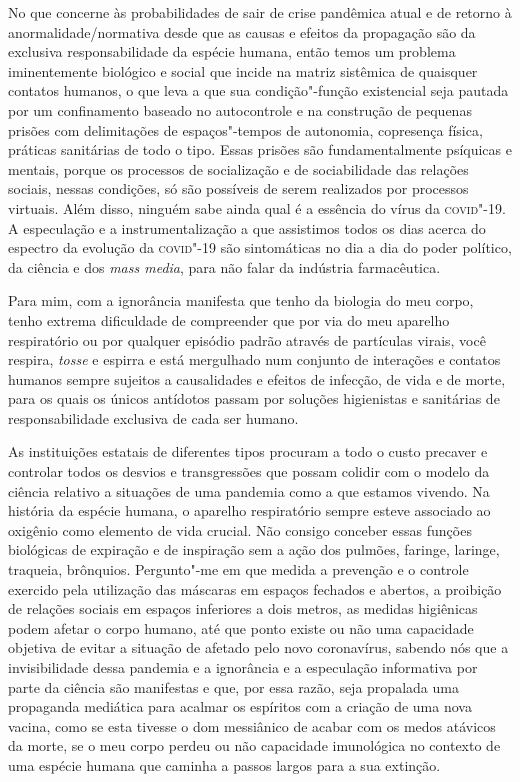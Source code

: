 No que concerne às probabilidades de sair de crise pandêmica atual e de
retorno à anormalidade/normativa desde que as causas e efeitos da
propagação são da exclusiva responsabilidade da espécie humana, então
temos um problema iminentemente biológico e social que incide na matriz
sistêmica de quaisquer contatos humanos, o que leva a que sua
condição"-função existencial seja pautada por um confinamento baseado no
autocontrole e na construção de pequenas prisões com delimitações de
espaços"-tempos de autonomia, copresença física, práticas sanitárias de
todo o tipo. Essas prisões são fundamentalmente psíquicas e mentais,
porque os processos de socialização e de sociabilidade das relações
sociais, nessas condições, só são possíveis de serem realizados por
processos virtuais. Além disso, ninguém sabe ainda qual é a essência do
vírus da \textsc{covid}"-19. A especulação e a instrumentalização a que assistimos
todos os dias acerca do espectro da evolução da \textsc{covid}"-19 são
sintomáticas no dia a dia do poder político, da ciência e dos \emph{mass
media}, para não falar da indústria farmacêutica.

Para mim, com a ignorância manifesta que tenho da biologia do meu corpo,
tenho extrema dificuldade de compreender que por via do meu aparelho
respiratório ou por qualquer episódio padrão através de partículas
virais, você respira, \emph{tosse} e espirra e está mergulhado num
conjunto de interações e contatos humanos sempre sujeitos a causalidades
e efeitos de infecção, de vida e de morte, para os quais os únicos
antídotos passam por soluções higienistas e sanitárias de
responsabilidade exclusiva de cada ser humano.

As instituições estatais de diferentes tipos procuram a todo o custo
precaver e controlar todos os desvios e transgressões que possam colidir
com o modelo da ciência relativo a situações de uma pandemia como a que
estamos vivendo. Na história da espécie humana, o aparelho respiratório
sempre esteve associado ao oxigênio como elemento de vida crucial. Não
consigo conceber essas funções biológicas de expiração e de inspiração
sem a ação dos pulmões, faringe, laringe, traqueia, brônquios.
Pergunto"-me em que medida a prevenção e o controle exercido pela
utilização das máscaras em espaços fechados e abertos, a proibição de
relações sociais em espaços inferiores a dois metros, as medidas
higiênicas podem afetar o corpo humano, até que ponto existe ou não uma
capacidade objetiva de evitar a situação de afetado pelo novo
coronavírus, sabendo nós que a invisibilidade dessa pandemia e a
ignorância e a especulação informativa por parte da ciência são
manifestas e que, por essa razão, seja propalada uma propaganda
mediática para acalmar os espíritos com a criação de uma nova vacina,
como se esta tivesse o dom messiânico de acabar com os medos atávicos da
morte, se o meu corpo perdeu ou não capacidade imunológica no contexto
de uma espécie humana que caminha a passos largos para a sua extinção.

